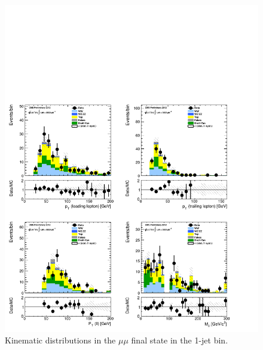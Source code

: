 \begin{figure}[!hbtp]
\centering
\includegraphics[width=1\textwidth]{figures/ww_analysis20_0_ALL_mm_1j.pdf}
\caption{Kinematic distributions in the $\mu\mu$ final state in the 1-jet bin.}
\label{fig:xs_kinematics_mm_1j}
\end{figure}

